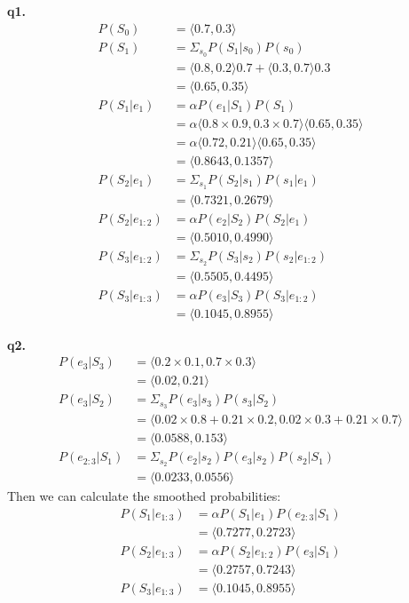\documentclass[cn,12pt]{homework}
\begin{document}
\begin{solution}
  \quad

\textbf{q1.} 
\begin{align*}
P(S_0) &= \langle 0.7, 0.3 \rangle \\
P(S_1) &= \Sigma_{s_0} P(S_1 | s_0) P(s_0) \\
&= \langle 0.8, 0.2 \rangle 0.7 + \langle 0.3, 0.7 \rangle 0.3 \\
&= \langle 0.65, 0.35 \rangle \\
P(S_1 | e_1) &= \alpha P(e_1 | S_1) P(S_1) \\
&= \alpha \langle 0.8 \times 0.9, 0.3 \times 0.7 \rangle \langle 0.65, 0.35 \rangle \\
&= \alpha \langle 0.72, 0.21 \rangle \langle 0.65, 0.35 \rangle \\
&= \langle 0.8643, 0.1357 \rangle \\
P(S_2 | e_1) &= \Sigma_{s_1} P(S_2 | s_1) P(s_1 | e_1) \\
&= \langle 0.7321, 0.2679 \rangle \\
P(S_2 | e_{1:2}) &= \alpha P(e_2 | S_2) P(S_2 | e_1) \\
&= \langle 0.5010, 0.4990 \rangle \\
P(S_3 | e_{1:2}) &= \Sigma_{s_2} P(S_3 | s_2) P(s_2 | e_{1:2}) \\
&= \langle 0.5505, 0.4495 \rangle \\
P(S_3 | e_{1:3}) &= \alpha P(e_3 | S_3) P(S_3 | e_{1:2}) \\
&= \langle 0.1045, 0.8955 \rangle
\end{align*}

\textbf{q2.}
\begin{align*}
P(e_3 | S_3) &= \langle 0.2 \times 0.1, 0.7 \times 0.3 \rangle \\
&= \langle 0.02, 0.21 \rangle \\
P(e_3 | S_2) &= \Sigma_{s_3} P(e_3 | s_3) P(s_3 | S_2) \\
&= \langle 0.02 \times 0.8 + 0.21 \times 0.2, 0.02 \times 0.3 + 0.21 \times 0.7 \rangle \\
&= \langle 0.0588, 0.153 \rangle \\
P(e_{2:3} | S_1) &= \Sigma_{s_2} P(e_2 | s_2) P(e_3 | s_2) P(s_2 | S_1) \\
&= \langle 0.0233, 0.0556 \rangle
\end{align*}
Then we can calculate the smoothed probabilities:
\begin{align*}
P(S_1 | e_{1:3}) &= \alpha P(S_1 | e_1) P(e_{2:3} | S_1) \\
&= \langle 0.7277, 0.2723 \rangle \\
P(S_2 | e_{1:3}) &= \alpha P(S_2 | e_{1:2}) P(e_3 | S_1) \\
&= \langle 0.2757, 0.7243 \rangle \\
P(S_3 | e_{1:3}) &= \langle 0.1045, 0.8955 \rangle
\end{align*}


\end{solution}
\end{document}
